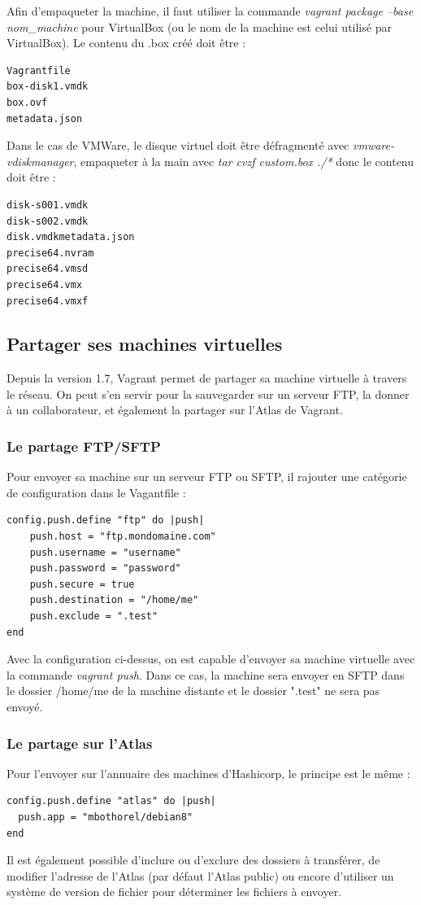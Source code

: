 \documentclass[12pt,a4paper]{article}
\begin{document}
Afin d'empaqueter la machine, il faut utiliser la commande \textit{vagrant package --base nom\_machine} pour VirtualBox (ou le nom de la machine est celui utilisé par VirtualBox). Le contenu du .box créé doit être :
\begin{lstlisting}
Vagrantfile
box-disk1.vmdk
box.ovf
metadata.json
\end{lstlisting}

Dans le cas de VMWare, le disque virtuel doit être défragmenté avec \textit{vmware-vdiskmanager}, empaqueter à la main avec \textit{tar cvzf custom.box ./*} donc le contenu doit être :
\begin{lstlisting}
disk-s001.vmdk
disk-s002.vmdk
disk.vmdkmetadata.json
precise64.nvram
precise64.vmsd
precise64.vmx
precise64.vmxf
\end{lstlisting}

\subsection{Partager ses machines virtuelles}
Depuis la version 1.7, Vagrant permet de partager sa machine virtuelle à travers le réseau. On peut s'en servir pour la sauvegarder sur un serveur FTP, la donner à un collaborateur, et également la partager sur l'Atlas de Vagrant.

\subsubsection{Le partage FTP/SFTP}
Pour envoyer sa machine sur un serveur FTP ou SFTP, il rajouter une catégorie de configuration dans le Vagantfile :
\begin{lstlisting}
config.push.define "ftp" do |push|
	push.host = "ftp.mondomaine.com"
	push.username = "username"
	push.password = "password"
	push.secure = true
	push.destination = "/home/me"
	push.exclude = ".test"
end
\end{lstlisting}
Avec la configuration ci-dessus, on est capable d'envoyer sa machine virtuelle avec la commande \textit{vagrant push}. Dans ce cas, la machine sera envoyer en SFTP dans le dossier /home/me de la machine distante et le dossier ".test" ne sera pas envoyé.

\subsubsection{Le partage sur l'Atlas}
Pour l'envoyer sur l'annuaire des machines d'Hashicorp, le principe est le même :
\begin{lstlisting}
config.push.define "atlas" do |push|
  push.app = "mbothorel/debian8"
end
\end{lstlisting}
Il est également possible d'inclure ou d'exclure des dossiers à transférer, de modifier l'adresse de l'Atlas (par défaut l'Atlas public) ou encore d'utiliser un système de version de fichier pour déterminer les fichiers à envoyer.
\end{document}
